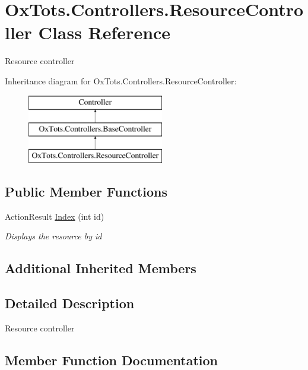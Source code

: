 \hypertarget{class_ox_tots_1_1_controllers_1_1_resource_controller}{}\section{Ox\+Tots.\+Controllers.\+Resource\+Controller Class Reference}
\label{class_ox_tots_1_1_controllers_1_1_resource_controller}


Resource controller  


Inheritance diagram for Ox\+Tots.\+Controllers.\+Resource\+Controller\+:\begin{figure}[H]
\begin{center}
\leavevmode
\includegraphics[height=3.000000cm]{class_ox_tots_1_1_controllers_1_1_resource_controller}
\end{center}
\end{figure}
\subsection*{Public Member Functions}
\begin{DoxyCompactItemize}
\item 
Action\+Result \mbox{\hyperlink{class_ox_tots_1_1_controllers_1_1_resource_controller_ae555ceb8f14a72759adeace54f94bea2}{Index}} (int id)
\begin{DoxyCompactList}\small\item\em Displays the resource by id \end{DoxyCompactList}\end{DoxyCompactItemize}
\subsection*{Additional Inherited Members}


\subsection{Detailed Description}
Resource controller 



\subsection{Member Function Documentation}
\mbox{\label{class_ox_tots_1_1_controllers_1_1_resource_controller_ae555ceb8f14a72759adeace54f94bea2}} 
